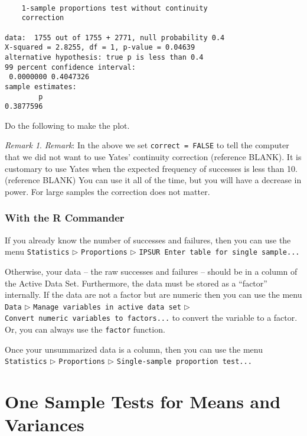 \documentclass[]{book}
\numberwithin{equation}{chapter}
\numberwithin{figure}{chapter}
\theoremstyle{plain}
\theoremstyle{definition}
\theoremstyle{remark}
\theoremstyle{definition}
\theoremstyle{definition}
\theoremstyle{remark}
\newtheorem*{remark}{Remark}
\begin{document}
\begin{verbatim}

    1-sample proportions test without continuity
    correction

data:  1755 out of 1755 + 2771, null probability 0.4
X-squared = 2.8255, df = 1, p-value = 0.04639
alternative hypothesis: true p is less than 0.4
99 percent confidence interval:
 0.0000000 0.4047326
sample estimates:
        p 
0.3877596 
\end{verbatim}

Do the following to make the plot.

\bigskip

\begin{remark}
\emph{Remark}: In the above we set \texttt{correct\ =\ FALSE} to tell
the computer that we did not want to use Yates' continuity correction
(reference BLANK). It is customary to use Yates when the expected
frequency of successes is less than 10. (reference BLANK) You can use it
all of the time, but you will have a decrease in power. For large
samples the correction does not matter.
\end{remark}

\subsubsection{With the R Commander}\label{with-the-r-commander}

If you already know the number of successes and failures, then you can
use the menu \texttt{Statistics} \(\triangleright\) \texttt{Proportions}
\(\triangleright\) \texttt{IPSUR\ Enter\ table\ for\ single\ sample...}

Otherwise, your data -- the raw successes and failures -- should be in a
column of the Active Data Set. Furthermore, the data must be stored as a
``factor'' internally. If the data are not a factor but are numeric then
you can use the menu \texttt{Data} \(\triangleright\)
\texttt{Manage\ variables\ in\ active\ data\ set} \(\triangleright\)
\texttt{Convert\ numeric\ variables\ to\ factors...} to convert the
variable to a factor. Or, you can always use the \texttt{factor}
function.

Once your unsummarized data is a column, then you can use the menu
\texttt{Statistics} \(\triangleright\) \texttt{Proportions}
\(\triangleright\) \texttt{Single-sample\ proportion\ test...}

\section{One Sample Tests for Means and
Variances}\label{sec-one-sample-tests}
\end{document}
